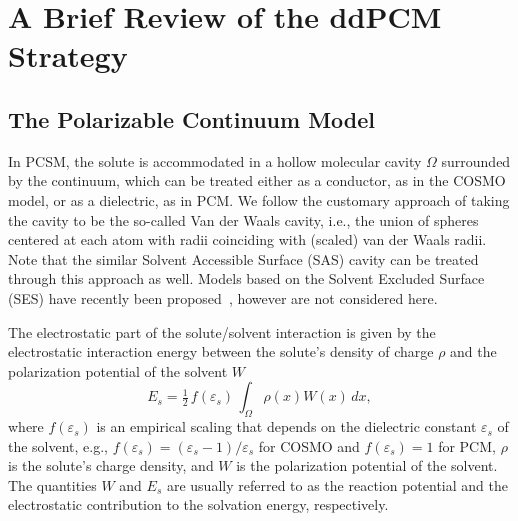 \section{A Brief Review of the ddPCM Strategy}\label{sec:review}

\subsection{The Polarizable Continuum Model}
In PCSM, the solute is accommodated in a hollow molecular cavity $\Omega$ surrounded by the continuum, which can be treated either as a conductor, as in the COSMO model, or as a dielectric, as in PCM. We follow the customary approach of taking the cavity to be the so-called Van der Waals cavity\cite{ReviewPCM_2005}, i.e., the union of spheres centered at each atom with radii coinciding with (scaled) van der Waals radii. Note that the similar Solvent Accessible Surface (SAS) cavity can be treated through this approach as well. Models based on the Solvent Excluded Surface (SES) have recently been proposed~\cite{Harbrecht2011,quan2017polarizable,C5CP03410H,JCC:JCC21431}, however are not considered here.

The electrostatic part of the solute/solvent interaction is given by the electrostatic interaction energy between the solute's density of charge $\rho$ and the polarization potential of the solvent $W$
\[
E_s = \tfrac{1}{2}\, f(\varepsilon_s)\,\int_\Omega \rho(x) W(x) \, dx,
\]
where $f(\varepsilon_s)$ is an empirical scaling that depends on the dielectric constant $\varepsilon_s$ of the solvent, e.g., $f(\varepsilon_s) = (\varepsilon_s - 1)/\varepsilon_s$ for COSMO and $f(\varepsilon_s) = 1$ for PCM, $\rho$ is the solute's charge density, and $W$ is the polarization potential of the solvent. The quantities $W$ and $E_s$ are usually referred to as the reaction potential and the electrostatic contribution to the solvation energy, respectively. 

